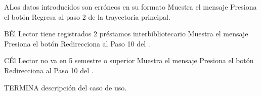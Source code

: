 		\begin{UCtrayectoriaA}{A}{Los datos introducidos son erróneos en su formato}
			\UCpaso[\UCsist] Muestra el mensaje 
			\UCpaso[\UCactor] Presiona el botón 
			\UCpaso[\UCsist] Regresa al paso 2 de la trayectoria principal.
		\end{UCtrayectoriaA}
		\begin{UCtrayectoriaA}{B}{Él Lector tiene registrados 2 préstamos interbibliotecario}
			\UCpaso[\UCsist] Muestra el mensaje 
			\UCpaso[\UCactor] Presiona el botón 
			\UCpaso[\UCsist] Redirecciona al Paso 10 del .
		\end{UCtrayectoriaA}
		\begin{UCtrayectoriaA}{C}{Él Lector no va en 5 semestre o superior}
			\UCpaso[\UCsist] Muestra el mensaje 
			\UCpaso[\UCactor] Presiona el botón 
			\UCpaso[\UCsist] Redirecciona al Paso 10 del .
		\end{UCtrayectoriaA}
		
TERMINA descripción del caso de uso.


